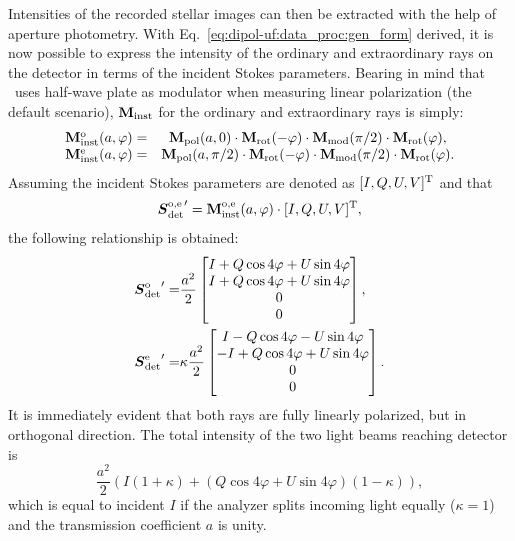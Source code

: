 Intensities of the recorded stellar images can then be extracted with the help of aperture photometry.
With Eq.~\ref{eq:dipol-uf:data_proc:gen_form} derived, it is now possible to express the intensity of the ordinary and extraordinary rays on the detector in terms of the incident Stokes parameters.
Bearing in mind that \DUF\ uses half-wave plate as modulator when measuring linear polarization (the default scenario), $ \mathbf{M}_{\mathrm{inst}}$ for the ordinary and extraordinary rays is simply:
\begin{equation}
    \begin{matrix}
        \mathbf{M}_{\mathrm{inst}}^{\mathrm{o}}(a, \varphi) = & \mathbf{M}_{\mathrm{pol}}(a, 0)\cdot \mathbf{M}_{\mathrm{rot}}(-\varphi) \cdot \mathbf{M}_{\mathrm{mod}}(\pi / 2) \cdot \mathbf{M}_{\mathrm{rot}}(\varphi), \\
        \mathbf{M}_{\mathrm{inst}}^{\mathrm{e}}(a, \varphi) = & \mathbf{M}_{\mathrm{pol}}(a, \pi / 2)\cdot \mathbf{M}_{\mathrm{rot}}(-\varphi) \cdot \mathbf{M}_{\mathrm{mod}}(\pi / 2) \cdot \mathbf{M}_{\mathrm{rot}}(\varphi).
    \end{matrix}
\end{equation}
Assuming the incident Stokes parameters are denoted as $[I, Q, U, V]^{\mathrm{T}}$ and that
\begin{equation}
    {\boldsymbol{S}_{\ensuremath{\mathrm{det}}}^{\ensuremath{\mathrm{o,e}}}}^\prime = \mathbf{M}_{\mathrm{inst}}^{\mathrm{o, e}}(a, \varphi) \cdot [I, Q, U, V]^{\mathrm{T}},
\end{equation}
the following relationship is obtained:
\begin{eqnarray}
    \label{eq:dipol-uf:data_proc:stokes_detector_o}
    {\boldsymbol{S}_{\ensuremath{\mathrm{det}}}^{\ensuremath{\mathrm{o}}}}^\prime  = & 
    \frac{a^2}{2}
    \begin{bmatrix}
        I + Q\cos4\varphi + U\sin4\varphi\\
        I + Q\cos4\varphi + U\sin4\varphi \\
        0 \\ 
        0 \\
    \end{bmatrix}, \\
    \label{eq:dipol-uf:data_proc:stokes_detector_e}
    {\boldsymbol{S}_{\ensuremath{\mathrm{det}}}^{\ensuremath{\mathrm{e}}}}^\prime  = & 
    \kappa \frac{a^2}{2}
    \begin{bmatrix}
        I - Q\cos4\varphi - U\sin4\varphi\\
        - I + Q\cos4\varphi + U\sin4\varphi \\
        0 \\ 
        0 \\
    \end{bmatrix}.
\end{eqnarray}
It is immediately evident that both rays are fully linearly polarized, but in orthogonal direction.
The total intensity of the two light beams reaching detector is 
\begin{equation}
    \frac{a^2}{2} \left( I(1 + \kappa) + (Q\cos4\varphi + U\sin4\varphi)(1 - \kappa)\right),
\end{equation}
which is equal to incident $I$ if the analyzer splits incoming light equally ($\kappa = 1$) and the transmission coefficient $a$ is unity.


